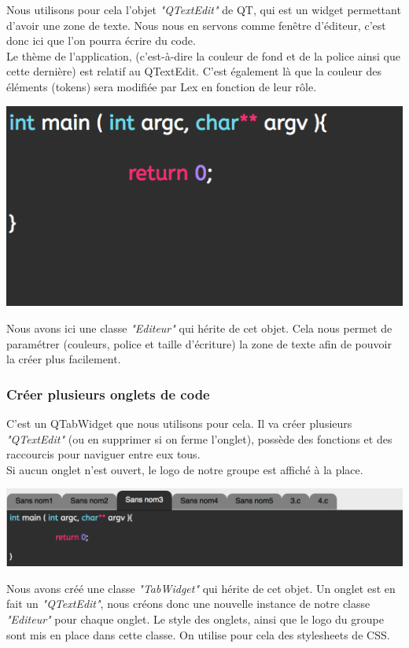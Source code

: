 \documentclass[a4paper,12pt]{article}
\begin{document}
			 	Nous utilisons pour cela l'objet \textit{"QTextEdit"} de QT, qui est un widget permettant d'avoir une zone de texte. Nous nous en servons comme fenêtre d'éditeur, c'est donc ici que l'on pourra écrire du code.\\
			Le thème de l'application, (c'est-à-dire la couleur de fond et de la police ainsi que cette dernière) est relatif au QTextEdit. C'est également là que la couleur des éléments (tokens) sera modifiée par Lex en fonction de leur rôle.\\
			\begin{center}
				\includegraphics[scale=0.8]{images/QTextEdit}
				\vspace{0.5cm}
			\end{center}
			Nous avons ici une classe \textit{"Editeur"} qui hérite de cet objet. Cela nous permet de paramétrer (couleurs, police et taille d'écriture) la zone de texte afin de pouvoir la créer plus facilement.\\
			
			\subsubsection*{Créer plusieurs onglets de code}
			
			 	C'est un QTabWidget que nous utilisons pour cela. Il va créer plusieurs \textit{"QTextEdit"} (ou en supprimer si on ferme l'onglet), possède des fonctions et des raccourcis pour naviguer entre eux tous. \\
			Si aucun onglet n'est ouvert, le logo de notre groupe est affiché à la place.\\
			\begin{center}
				\includegraphics[scale=0.6]{images/QTabWidget}
				\vspace{0.5cm}
			\end{center}
			Nous avons créé une classe \textit{"TabWidget"} qui hérite de cet objet. Un onglet est en fait un \textit{"QTextEdit"}, nous créons donc une nouvelle instance de notre classe \textit{"Editeur"} pour chaque onglet. Le style des onglets, ainsi que le logo du groupe sont mis en place dans cette classe. On utilise pour cela des stylesheets de CSS.\\
			
\end{document}

